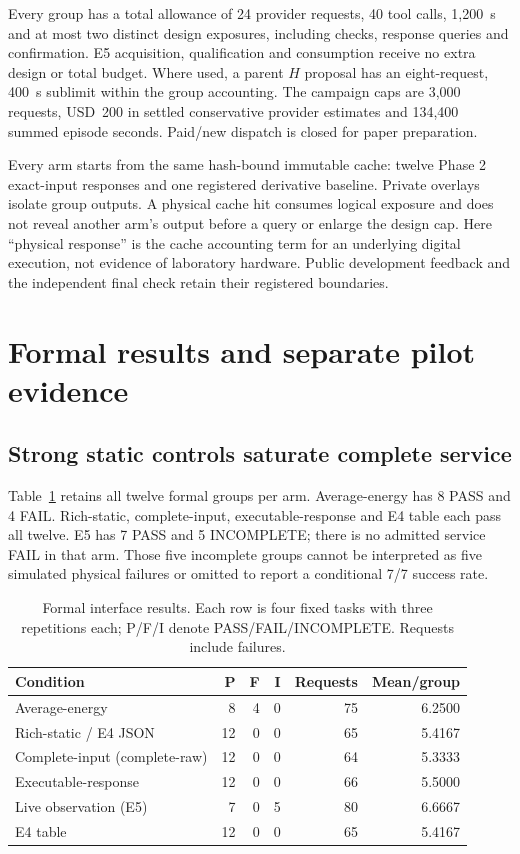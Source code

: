Every group has a total allowance of 24 provider requests, 40 tool calls,
1,200~s and at most two distinct design exposures, including checks, response
queries and confirmation. E5 acquisition, qualification and consumption receive
no extra design or total budget. Where used, a parent $H$ proposal has an
eight-request, 400~s sublimit within the group accounting. The campaign caps are
3,000 requests, USD~200 in settled conservative provider estimates and
134,400 summed episode seconds. Paid/new dispatch is closed for paper preparation.

Every arm starts from the same hash-bound immutable cache: twelve Phase 2
exact-input responses and one registered derivative baseline. Private overlays
isolate group outputs. A physical cache hit consumes logical exposure and
does not reveal another arm's output before a query or enlarge the design cap.
Here ``physical response'' is the cache accounting term for an underlying
digital execution, not evidence of laboratory hardware. Public development
feedback and the independent final check retain their registered boundaries.

\section{Formal results and separate pilot evidence}
\subsection{Strong static controls saturate complete service}
Table~\ref{tab:formal} retains all twelve formal groups per arm. Average-energy
has 8 PASS and 4 FAIL. Rich-static, complete-input, executable-response
and E4 table each pass all twelve. E5 has 7 PASS and 5 INCOMPLETE;
there is no admitted service FAIL in that arm. Those five incomplete groups
cannot be interpreted as five simulated physical failures or omitted to report
a conditional 7/7 success rate.

\begin{table}[htbp]
\centering\small
\caption{Formal interface results. Each row is four fixed tasks with three
repetitions each; P/F/I denote PASS/FAIL/INCOMPLETE. Requests include failures.}
\label{tab:formal}
\begin{tabular}{@{}lrrrrr@{}}\toprule
Condition & P & F & I & Requests & Mean/group \\\midrule
Average-energy & 8 & 4 & 0 & 75 & 6.2500 \\
Rich-static / E4 JSON & 12 & 0 & 0 & 65 & 5.4167 \\
Complete-input (complete-raw) & 12 & 0 & 0 & 64 & 5.3333 \\
Executable-response & 12 & 0 & 0 & 66 & 5.5000 \\
Live observation (E5) & 7 & 0 & 5 & 80 & 6.6667 \\
E4 table & 12 & 0 & 0 & 65 & 5.4167 \\
\bottomrule\end{tabular}
\end{table}

